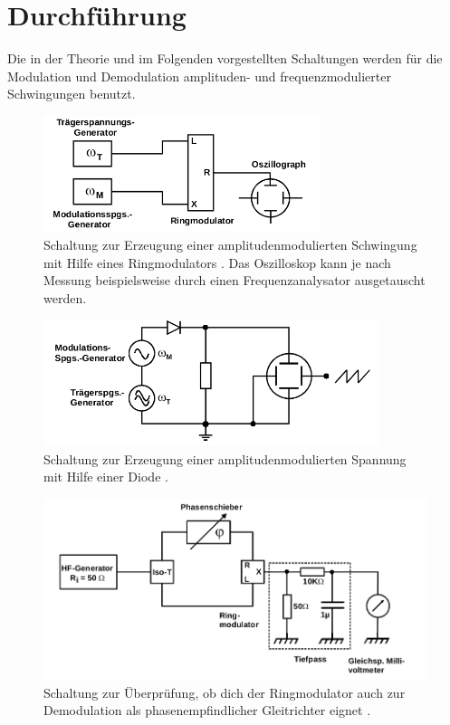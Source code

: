 \section{Durchführung}
\label{sec:Durchführung}

Die in der Theorie und im Folgenden vorgestellten Schaltungen werden für die Modulation und
Demodulation amplituden- und frequenzmodulierter Schwingungen benutzt.

\begin{figure}[H]
  \centering
  \includegraphics[height=3.4cm]{JasperErsterSchultag/expab.png}
  \caption{Schaltung zur Erzeugung einer amplitudenmodulierten Schwingung mit Hilfe eines Ringmodulators \cite{anleitung}.
  Das Oszilloskop kann je nach Messung beispielsweise durch einen Frequenzanalysator ausgetauscht werden.}
  \label{fig:expab}
\end{figure}

\begin{figure}[H]
  \centering
  \includegraphics[height=3.7cm]{JasperErsterSchultag/expc.png}
  \caption{Schaltung zur Erzeugung einer amplitudenmodulierten Spannung mit Hilfe einer Diode \cite{anleitung}.}
  \label{fig:expc}
\end{figure}

\begin{figure}[H]
  \centering
  \includegraphics[height=5.3cm]{JasperErsterSchultag/expef.png}
  \caption{Schaltung zur Überprüfung, ob dich der Ringmodulator auch zur Demodulation als
  phasenempfindlicher Gleitrichter eignet \cite{anleitung}.}
  \label{fig:expef}
\end{figure}

